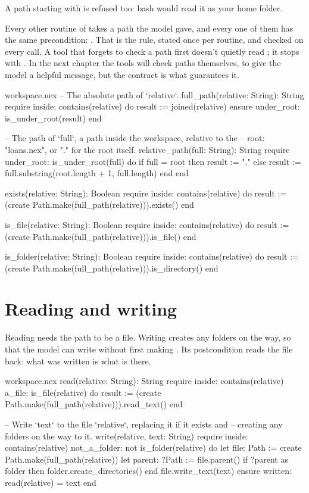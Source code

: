 A path starting with \code{~} is refused too: bash would read it as your
home folder.

Every other routine of  takes a path the model gave, and
every one of them has the same precondition: . That is the rule, stated once per routine, and
checked on every call. A tool that forgets to check a path first doesn't
quietly read ; it stops with . In the next chapter the tools will check paths
themselves, to give the model a helpful message, but the contract is what
guarantees it.

\begin{continued}{workspace.nex}
  -- The absolute path of `relative`.
  full_path(relative: String): String
  require
    inside: contains(relative)
  do
    result := joined(relative)
  ensure
    under_root: is_under_root(result)
  end

  -- The path of `full`, a path inside the workspace, relative to the
  -- root: "loans.nex", or "." for the root itself.
  relative_path(full: String): String
  require
    under_root: is_under_root(full)
  do
    if full = root then
      result := "."
    else
      result := full.substring(root.length + 1, full.length)
    end
  end

  exists(relative: String): Boolean
  require
    inside: contains(relative)
  do
    result := (create Path.make(full_path(relative))).exists()
  end

  is_file(relative: String): Boolean
  require
    inside: contains(relative)
  do
    result := (create Path.make(full_path(relative))).is_file()
  end

  is_folder(relative: String): Boolean
  require
    inside: contains(relative)
  do
    result := (create Path.make(full_path(relative))).is_directory()
  end
\end{continued}

\section{Reading and writing}

Reading needs the path to be a file. Writing creates any folders on the
way, so that the model can write  without first
making . Its postcondition reads the file back: what was
written is what is there.

\begin{continued}{workspace.nex}
  read(relative: String): String
  require
    inside: contains(relative)
    a_file: is_file(relative)
  do
    result := (create Path.make(full_path(relative))).read_text()
  end

  -- Write `text` to the file `relative`, replacing it if it exists and
  -- creating any folders on the way to it.
  write(relative, text: String)
  require
    inside: contains(relative)
    not_a_folder: not is_folder(relative)
  do
    let file: Path := create Path.make(full_path(relative))
    let parent: ?Path := file.parent()
    if ?parent as folder then
      folder.create_directories()
    end
    file.write_text(text)
  ensure
    written: read(relative) = text
  end
\end{continued}

